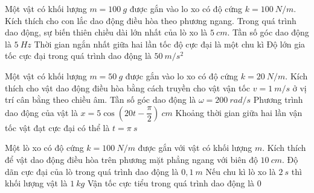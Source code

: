 \begin{ex}%
Một vật có khối lượng $m=100 \ g$ được gắn vào lo xo có độ cứng $k=100 \ N/m$. Kích thích cho con lắc dao động điều hòa theo phương ngang. Trong quá trình dao động, sự biến thiên chiều dài lớn nhất của lò xo là $5 \ cm$.
{Tần số góc dao động là $5 \ Hz$}
{Thời gian ngắn nhất giữa hai lần tốc độ cực đại là một chu kì}
{\True Độ lớn gia tốc cực đại trong quá trình dao động là $50 \ m/s^2$}
\end{ex} 
\begin{ex}%
Một vật có khối lượng $m=50 \ g$ được gắn vào lo xo có độ cứng $k=20 \ N/m$. Kích thích cho vật dao động điều hòa bằng cách truyền cho vật vận tốc $v=1 \ m/s$ ở vị trí cân bằng theo chiều âm.
{Tần số góc dao động là $\omega=200\ rad/s$}
{Phương trình dao động của vật là $x=5 \cos (20 t-\dfrac{\pi}{2})\ cm$}
{\True Khoảng thời gian giữa hai lần vận tốc vật đạt cực đại có thể là $t=\pi\ s$}
\end{ex} 
\begin{ex}%
Một lò xo có độ cứng $k=100 \ N/m$ được gắn với vật có khối lượng $m$. Kích thích để vật dao động điều hòa trên phương mặt phẳng ngang với biên độ $10 \ cm$.
{\True Độ dãn cực đại của lò trong quá trình dao động là $0,1 \ m$}
{Nếu chu kì lò xo là $2 \ s$ thì khối lượng vật là $1 \ kg$}
{Vận tốc cực tiểu trong quá trình dao động là 0}
\end{ex} 
